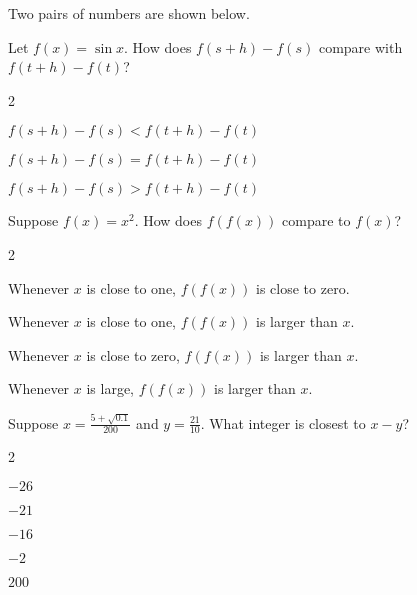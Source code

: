 \documentclass[12pt]{ximera}
\renewenvironment{multipleChoice}
{\begin{trivlist}\item[\hskip\labelsep\small\bfseries Choose the best answer:]
\hfil\begin{enumerate}\begin{multicols}{2}}
 {\end{multicols}\end{enumerate}\end{trivlist}}
\renewcommand{\choice}[2][]{\item \begin{minipage}[t]{2in}#2\end{minipage}\ifthenelse{\boolean{#1}}{\ifhandout \else  \fi}{}}
\begin{document}
\vspace{6ex}

\begin{minipage}{\textwidth}
\begin{problem}
  Two pairs of numbers are shown below.
  \begin{image}
  \end{image}
  Let $f(x) = \sin x$.  How does $f(s+h)-f(s)$ compare with $f(t+h) - f(t)$?
  \begin{multipleChoice}
    \choice{$f(s+h) - f(s) < f(t+h) - f(t)$}
    \choice{$f(s+h) - f(s) = f(t+h) - f(t)$}
    \choice[correct]{$f(s+h) - f(s) > f(t+h) - f(t)$}
  \end{multipleChoice}
\end{problem}
\end{minipage}

\vspace{6ex}

\begin{minipage}{\textwidth}
\begin{problem}
  Suppose $f(x) = x^2$.  How does $f(f(x))$ compare to $f(x)$?
  \begin{multipleChoice}
    \choice{Whenever $x$ is close to one, $f(f(x))$ is close to zero.}
    \choice{Whenever $x$ is close to one, $f(f(x))$ is larger than $x$.}
    \choice{Whenever $x$ is close to zero, $f(f(x))$ is larger than $x$.}
    \choice[correct]{Whenever $x$ is large, $f(f(x))$ is larger than $x$.}
  \end{multipleChoice}
\end{problem}
\end{minipage}

\vspace{6ex}

\begin{minipage}{\textwidth}
\begin{problem}
  Suppose $x = \frac{5 + \sqrt{0.1}}{200}$ and $y = \frac{21}{10}$.  What integer is closest to $x - y$?
  \begin{multipleChoice}
    \choice{$-26$}
    \choice{$-21$}
    \choice{$-16$}
    \choice[correct]{$-2$}
    \choice{$200$}
  \end{multipleChoice}
\end{problem}
\end{minipage}
\end{document}
